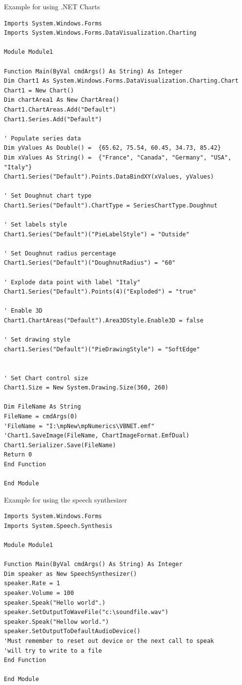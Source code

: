 \newpage
\noindent Example for using .NET Charts


\begin{lstlisting}
Imports System.Windows.Forms
Imports System.Windows.Forms.DataVisualization.Charting

Module Module1

Function Main(ByVal cmdArgs() As String) As Integer
Dim Chart1 As System.Windows.Forms.DataVisualization.Charting.Chart
Chart1 = New Chart()
Dim chartArea1 As New ChartArea()
Chart1.ChartAreas.Add("Default")
Chart1.Series.Add("Default")  

' Populate series data
Dim yValues As Double() =  {65.62, 75.54, 60.45, 34.73, 85.42}
Dim xValues As String() =  {"France", "Canada", "Germany", "USA", "Italy"}
Chart1.Series("Default").Points.DataBindXY(xValues, yValues)

' Set Doughnut chart type
Chart1.Series("Default").ChartType = SeriesChartType.Doughnut

' Set labels style
Chart1.Series("Default")("PieLabelStyle") = "Outside"

' Set Doughnut radius percentage
Chart1.Series("Default")("DoughnutRadius") = "60"

' Explode data point with label "Italy"
Chart1.Series("Default").Points(4)("Exploded") = "true"

' Enable 3D
Chart1.ChartAreas("Default").Area3DStyle.Enable3D = false

' Set drawing style
chart1.Series("Default")("PieDrawingStyle") = "SoftEdge"


' Set Chart control size
Chart1.Size = New System.Drawing.Size(360, 260)

Dim FileName As String
FileName = cmdArgs(0)
'FileName = "I:\mpNew\mpNumerics\VBNET.emf"
'Chart1.SaveImage(FileName, ChartImageFormat.EmfDual)
Chart1.Serializer.Save(FileName)    
Return 0
End Function

End Module
\end{lstlisting}



\newpage
\noindent Example for using the speech synthesizer


\begin{lstlisting}
Imports System.Windows.Forms
Imports System.Speech.Synthesis 

Module Module1

Function Main(ByVal cmdArgs() As String) As Integer
Dim speaker as New SpeechSynthesizer()
speaker.Rate = 1
speaker.Volume = 100
speaker.Speak("Hello world".)
speaker.SetOutputToWaveFile("c:\soundfile.wav")
speaker.Speak("Hellow world.")
speaker.SetOutputToDefaultAudioDevice()
'Must remember to reset out device or the next call to speak 
'will try to write to a file
End Function

End Module
\end{lstlisting}




